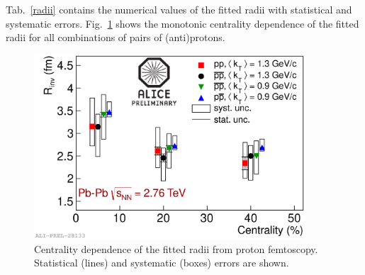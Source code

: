 Tab.~\ref{radii} contains the numerical values of the fitted radii with statistical and systematic errors.
Fig.~\ref{Rinvvscentralityprotons} shows the monotonic centrality dependence of the fitted radii for all combinations of pairs of (anti)protons.
\begin{figure}
  \centering
  \includegraphics[width=0.9\textwidth]{2012-Jul-26-RinvVsCentralityProtons}
  \caption{Centrality dependence of the fitted radii from proton femtoscopy. Statistical (lines) and systematic (boxes) errors are shown.}
  \label{Rinvvscentralityprotons}
\end{figure}


